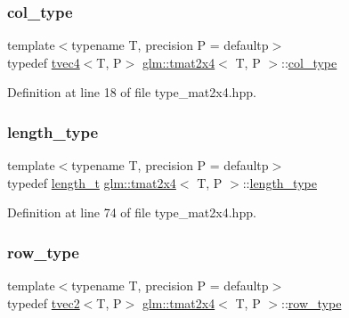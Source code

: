\subsubsection{\texorpdfstring{col\_type}{col\_type}}
{\footnotesize\ttfamily template$<$typename T, precision P = defaultp$>$ \\
typedef \mbox{\hyperlink{structglm_1_1tvec4}{tvec4}}$<$T, P$>$ \mbox{\hyperlink{structglm_1_1tmat2x4}{glm\+::tmat2x4}}$<$ T, P $>$\+::\mbox{\hyperlink{structglm_1_1tmat2x4_a9effcccd2c4c50c385e4c3a2fe2feedb}{col\+\_\+type}}}



Definition at line 18 of file type\+\_\+mat2x4.\+hpp.

\mbox{\label{structglm_1_1tmat2x4_a8d8156b982138c22047082ca7a8f9009}} 
\subsubsection{\texorpdfstring{length\_type}{length\_type}}
{\footnotesize\ttfamily template$<$typename T, precision P = defaultp$>$ \\
typedef \mbox{\hyperlink{namespaceglm_a090a0de2260835bee80e71a702492ed9}{length\+\_\+t}} \mbox{\hyperlink{structglm_1_1tmat2x4}{glm\+::tmat2x4}}$<$ T, P $>$\+::\mbox{\hyperlink{structglm_1_1tmat2x4_a8d8156b982138c22047082ca7a8f9009}{length\+\_\+type}}}



Definition at line 74 of file type\+\_\+mat2x4.\+hpp.

\mbox{\label{structglm_1_1tmat2x4_a3c55d4a9be73c34967ab6f5010d8ae70}} 
\subsubsection{\texorpdfstring{row\_type}{row\_type}}
{\footnotesize\ttfamily template$<$typename T, precision P = defaultp$>$ \\
typedef \mbox{\hyperlink{structglm_1_1tvec2}{tvec2}}$<$T, P$>$ \mbox{\hyperlink{structglm_1_1tmat2x4}{glm\+::tmat2x4}}$<$ T, P $>$\+::\mbox{\hyperlink{structglm_1_1tmat2x4_a3c55d4a9be73c34967ab6f5010d8ae70}{row\+\_\+type}}}



